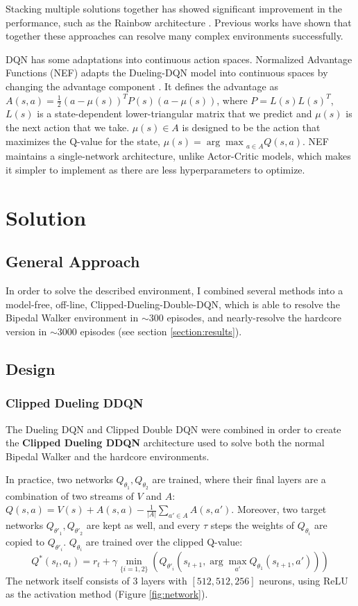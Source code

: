 \documentclass{article}
\begin{document}
\begin{multicols}{2}
Stacking multiple solutions together has showed significant improvement in the performance, such as the Rainbow architecture \cite{Rainbow}. Previous works have shown that together these approaches can resolve many complex environments successfully.

DQN has some adaptations into continuous action spaces. Normalized Advantage Functions (NEF) adapts the Dueling-DQN model into continuous spaces by changing the advantage component \cite{NEF}.
It defines the advantage as $A(s,a) = \frac12 (a-\mu(s))^T P(s) (a - \mu(s))$, where $P=L(s)L(s)^T$, $L(s)$ is a state-dependent lower-triangular matrix that we predict and $\mu(s)$ is the next action that we take. $\mu(s) \in A$ is designed to be the action that maximizes the Q-value for the state, $\mu(s) = {\arg \max}_{a\in A} Q(s,a)$. NEF maintains a single-network architecture, unlike Actor-Critic models, which makes it simpler to implement as there are less hyperparameters to optimize.

\section{Solution}

\subsection{General Approach}
In order to solve the described environment, I combined several methods into a model-free, off-line, Clipped-Dueling-Double-DQN, which is able to resolve the Bipedal Walker environment in $\sim 300$ episodes, and nearly-resolve the hardcore version in $\sim 3000$ episodes (see section \ref{section:results}).


\subsection{Design}
\subsubsection{Clipped Dueling DDQN}
The Dueling DQN and Clipped Double DQN were combined in order to create the \textbf{Clipped Dueling DDQN} architecture used to solve both the normal Bipedal Walker and the hardcore environments.

In practice, two networks $Q_{\theta_1}, Q_{\theta_2}$ are trained, where their final layers are a combination of two streams of $V$ and $A$: $Q(s,a)=V(s)+A(s,a) - \frac1{|A|}\sum_{a'\in A}A(s,a')$. Moreover, two target networks $Q_{\theta'_1}, Q_{\theta'_2}$ are kept as well, and every $\tau$ steps the weights of $Q_{\theta_i}$ are copied to $Q_{\theta'_i}$. $Q_{\theta_i}$ are trained over the clipped Q-value: 
$$Q^*(s_t, a_t) = r_t + \gamma \min_{\{i = 1, 2\}} (Q_{\theta'_i}(s_{t+1}, \arg \max_{a'}Q_{\theta_1}(s_{t+1}, a')))$$
The network itself consists of 3 layers with $[512, 512, 256]$ neurons, using ReLU as the activation method (Figure \ref{fig:network}).


\end{multicols}
\end{document}
